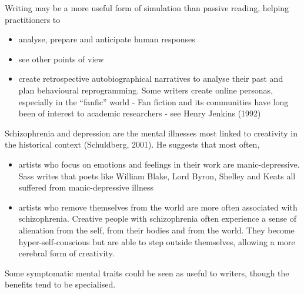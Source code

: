 \documentclass[11pt]{article}
\begin{document}
Writing may be a more useful form of simulation than passive reading, helping practitioners to

\begin{itemize} 
\item  analyse, prepare and anticipate human responses
\item  see other points of view 
\item  create retrospective autobiographical
narratives to analyse their past and plan behavioural reprogramming. Some writers create online personas, especially in the ``fanfic'' world - Fan fiction and its communities have long been of interest to academic researchers - see Henry Jenkins (1992)
\end{itemize}



Schizophrenia and depression are the mental illnesses most linked to creativity in the historical context (Schuldberg, 2001). He suggests that most often,

\begin{itemize}
         \item  artists who focus on emotions and feelings in their work are manic-depressive. Sass writes that poets like William Blake, Lord Byron, Shelley and Keats all suffered from manic-depressive illness
         \item  artists who remove themselves from the world are more often associated with schizophrenia. Creative people with schizophrenia often experience a sense of alienation from the self, from their bodies and from the world. They become hyper-self-conscious but are able to step outside themselves, allowing a more cerebral form of creativity.
\end{itemize}


Some  symptomatic mental traits could be seen as useful to writers, though the benefits tend to be specialised.
\end{document}
